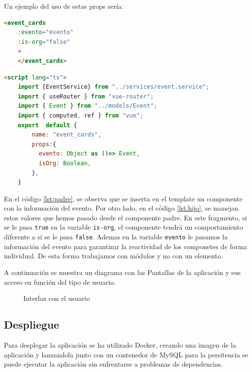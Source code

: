 Un ejemplo del uso de estas props sería:
\myvuestyle
\begin{lstlisting}[language=HTML, caption=Ejemplo del Padre, label=lst:padre]
    <event_cards
    :evento="evento"
    :is-org="false"
    >
    </event_cards>
\end{lstlisting}
\myvuestyle
\begin{lstlisting}[language=HTML, caption=Ejemplo del Hijo, label=lst:hijo]
    <script lang="ts">
    import {EventService} from "../services/event.service";
    import { useRouter } from "vue-router";
    import { Event } from "../models/Event";
    import { computed, ref } from "vue";
    export  default {
        name: "event_cards",
        props:{
          evento: Object as ()=> Event,
          isOrg: Boolean,
        },
    }
\end{lstlisting}

En el código \ref{lst:padre}, se observa que se inserta en el template un componente con la información del evento. Por otro lado, en el código 
\ref{lst:hijo}, se manejan estos valores que hemos pasado desde el componente padre. En este fragmento, si se le pasa \texttt{true} en la variable 
\texttt{is-org}, el componente tendrá un comportamiento diferente a si se le pasa \texttt{false}. Ademas en la variable \texttt{evento} le pasamos la información
del evento para garantizar la reactividad de los componetes de forma individual. De esta forma trabajamos con módulos y no con un elemento.

\newpage
A continuación se muestra un diagrama con las Pantallas de la aplicación y sus acceso en función del tipo de usuario.
\begin{figure}[h]
    \centering
    \caption{Interfaz con el usuario}
    \label{fig:userInterface}
\end{figure}

\newpage
\subsection{Despliegue}
Para desplegar la aplicación se ha utilizado Docker, creando una imagen de la aplicación y lanzandola junto con un contenedor de MySQL para la persitencia se puede ejecutar
la aplicación sin enfrentarse a problemas de dependencias.

